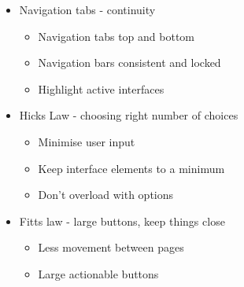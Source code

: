 \documentclass[a4 paper, 12pt]{article}
\begin{document}
\begin{multicols}{2}
\begin{itemize}
            \item Navigation tabs - continuity
                \begin{itemize}
                    \item Navigation tabs top and bottom
                    \item Navigation bars consistent and locked
                    \item Highlight active interfaces 
                \end{itemize}
            \item Hicks Law - choosing right number of choices
                \begin{itemize}
                    \item Minimise user input
                    \item Keep interface elements to a minimum
                    \item Don't overload with options
                \end{itemize}
            \item Fitts law - large buttons, keep things close
                \begin{itemize}
                    \item Less movement between pages
                    \item Large actionable buttons 
                \end{itemize}
            \end{itemize}
        \end{multicols}     
    
\end{document}
